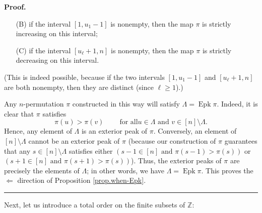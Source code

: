\documentclass[numbers=enddot,12pt,final,onecolumn,notitlepage]{scrartcl}%
\theoremstyle{definition}
\newenvironment{proof}[1][Proof]{\noindent\textbf{#1.} }{\ \rule{0.5em}{0.5em}}
\newenvironment{verlong}{}{}
\begin{document}
\begin{verlong}
\begin{proof}
\begin{itemize}
\begin{itemize}
\item[(B)] if the interval $\left[  1,u_{1}-1\right]  $ is nonempty, then the
map $\pi$ is strictly increasing on this interval;

\item[(C)] if the interval $\left[  u_{\ell}+1,n\right]  $ is nonempty, then
the map $\pi$ is strictly decreasing on this interval.
\end{itemize}

(This is indeed possible, because if the two intervals $\left[  1,u_{1}%
-1\right]  $ and $\left[  u_{\ell}+1,n\right]  $ are both nonempty, then they
are distinct (since $\ell\geq1$).)
\end{itemize}

Any $n$-permutation $\pi$ constructed in this way will satisfy $\Lambda
=\operatorname*{Epk}\pi$. Indeed, it is clear that $\pi$ satisfies%
\[
\pi\left(  u\right)  >\pi\left(  v\right)  \ \ \ \ \ \ \ \ \ \ \text{for all
}u\in\Lambda\text{ and }v\in\left[  n\right]  \setminus\Lambda.
\]
Hence, any element of $\Lambda$ is an exterior peak of $\pi$. Conversely, an
element of $\left[  n\right]  \setminus\Lambda$ cannot be an exterior peak of
$\pi$ (because our construction of $\pi$ guarantees that any $s\in\left[
n\right]  \setminus\Lambda$ satisfies either $\left(  s-1\in\left[  n\right]
\text{ and }\pi\left(  s-1\right)  >\pi\left(  s\right)  \right)  $ or
$\left(  s+1\in\left[  n\right]  \text{ and }\pi\left(  s+1\right)
>\pi\left(  s\right)  \right)  $). Thus, the exterior peaks of $\pi$ are
precisely the elements of $\Lambda$; in other words, we have $\Lambda
=\operatorname*{Epk}\pi$. This proves the $\Longleftarrow$ direction of
Proposition \ref{prop.when-Epk}.
\end{proof}
\end{verlong}

Next, let us introduce a total order on the finite subsets of $\mathbb{Z}$:
\end{document}
